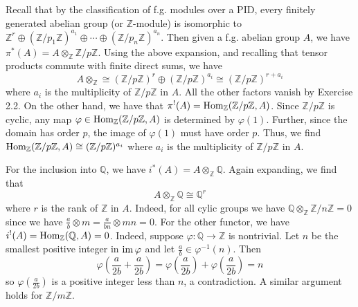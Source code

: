\documentclass[../../master.tex]{subfiles}
\begin{document}
\begin{solution}
    Recall that by the classification of f.g. modules over a PID, every finitely generated abelian group (or $\mathbb{Z}$-module) is isomorphic to $\mathbb{Z}^{r} \oplus (\mathbb{Z}/p_1\mathbb{Z})^{a_1} \oplus \cdots \oplus (\mathbb{Z}/p_n\mathbb{Z})^{a_n}$.
    Then given a f.g. abelian group $A$, we have $\pi^{*}(A) = A \otimes_\mathbb{Z} \mathbb{Z}/p\mathbb{Z}$.
    Using the above expansion, and recalling that tensor products commute with finite direct sums, we have
    \[
    A \otimes_\mathbb{Z} \cong (\mathbb{Z}/p\mathbb{Z})^{r} \oplus (\mathbb{Z}/p\mathbb{Z})^{a_i} \cong (\mathbb{Z}/p\mathbb{Z})^{r + a_i}
    \]
    where $a_i$ is the multiplicity of $\mathbb{Z}/p\mathbb{Z}$ in $A$.
    All the other factors vanish by Exercise 2.2.
    On the other hand, we have that $\pi^{!}(A) = \operatorname{Hom}_\mathbb{Z}(\mathbb{Z}/p\mathbb{Z}, A)$.
    Since $\mathbb{Z}/p\mathbb{Z}$ is cyclic, any map $\varphi \in \operatorname{Hom}_\mathbb{Z}(\mathbb{Z}/p\mathbb{Z}, A)$ is determined by $\varphi(1)$.
    Further, since the domain has order $p$, the image of $\varphi(1)$ must have order $p$.
    Thus, we find $\operatorname{Hom}_\mathbb{Z}(\mathbb{Z}/p\mathbb{Z}, A) \cong (\mathbb{Z}/p\mathbb{Z})^{a_i}$ where $a_i$ is the multiplicity of $\mathbb{Z}/p\mathbb{Z}$ in $A$.

    For the inclusion into $\mathbb{Q}$, we have $i^{*}(A) = A \otimes_\mathbb{Z} \mathbb{Q}$.
    Again expanding, we find that
    \[
    A \otimes_\mathbb{Z} \mathbb{Q} \cong \mathbb{Q}^{r}
    \]
    where $r$ is the rank of $\mathbb{Z}$ in $A$.
    Indeed, for all cylic groups we have $\mathbb{Q} \otimes_\mathbb{Z} \mathbb{Z}/n\mathbb{Z} = 0$ since we have $\frac{a}{b} \otimes m = \frac{a}{bn} \otimes mn = 0$.
    For the other functor, we have $i^{!}(A) = \operatorname{Hom}_\mathbb{Z}(\mathbb{Q}, A) = 0$.
    Indeed, suppose $\varphi : \mathbb{Q} \to \mathbb{Z}$ is nontrivial.
    Let $n$ be the smallest positive integer in $\operatorname{im} \varphi$ and let $\frac{a}{b} \in \varphi^{-1}(n)$.
    Then
    \[
    \varphi\left( \frac{a}{2b} + \frac{a}{2b}\right) = \varphi\left( \frac{a}{2b}\right) + \varphi\left( \frac{a}{2b} \right) = n
    \]
    so $\varphi \left( \frac{a}{2b}\right)$ is a positive integer less than $n$, a contradiction.
    A similar argument holds for $\mathbb{Z}/m\mathbb{Z}$.
\end{solution}
\end{document}
